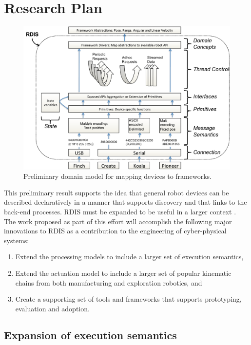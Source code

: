 
\section{Research Plan}
\label{sec:research-plan}

\begin{figure}[thpb]
      \centering
      \includegraphics[width=5in]{dm.pdf}
      \caption{Preliminary domain model for mapping devices to frameworks.}
      \label{dm}
\end{figure}

This preliminary result supports the idea that general robot devices can be described declaratively in a manner that supports discovery and that links to the back-end processes.  RDIS must be expanded to be useful in a larger context .  The work proposed as part of this effort will accomplish the following major innovations to RDIS as a contribution to the engineering of cyber-physical systems: 
\begin{enumerate}
\item Extend the processing models to include a larger set of execution semantics, 
\item Extend the actuation model to include a larger set of popular kinematic chains from both manufacturing and exploration robotics, and
\item Create a supporting set of tools and frameworks that supports prototyping, evaluation and adoption.   
\end{enumerate}

\subsection{Expansion of execution semantics}

